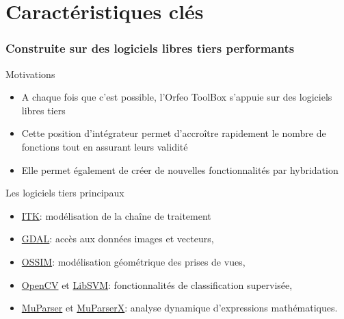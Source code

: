 \documentclass[8pt]{beamer}
\begin{document}
\section{Caractéristiques clés}

\begin{frame}
\frametitle{Construite sur des logiciels libres tiers performants}
\begin{block}{Motivations}
\begin{itemize}
\item A chaque fois que c'est possible, l'Orfeo ToolBox s'appuie sur des
  logiciels libres tiers
\item Cette position d'intégrateur permet d'accroître rapidement le nombre de fonctions tout en assurant leurs validité
\item Elle permet également de créer de nouvelles fonctionnalités par hybridation
\end{itemize}
\end{block}

\begin{block}{Les logiciels tiers principaux}
\begin{itemize}
\item \href{www.itk.org}{ITK}: modélisation de la chaîne de traitement
\item \href{www.gdal.org}{GDAL}: accès aux données images et vecteurs,
\item \href{www.ossim.org}{OSSIM}: modélisation géométrique des prises de vues,
\item \href{www.opencv.org}{OpenCV} et \href{www.libsvm.org}{LibSVM}: fonctionnalités de classification supervisée,
\item \href{www.muparser.org}{MuParser} et \href{www.muparserx.org}{MuParserX}:
analyse dynamique d'expressions mathématiques.
\end{itemize}
\end{block}


\end{frame}
\end{document}
